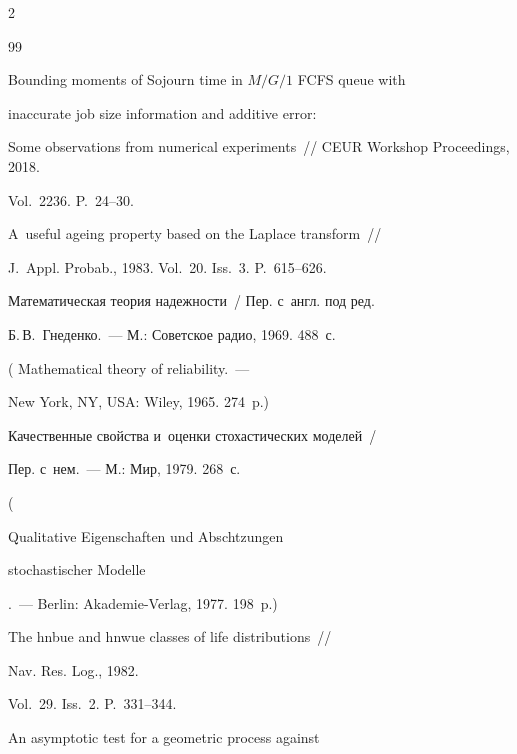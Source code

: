\begin{multicols}{2}
{{\begin{thebibliography}{99}

Bounding moments of Sojourn time in $M/G/1$ FCFS queue with 

inaccurate job size information and additive error: 

Some observations from numerical experiments~// CEUR Workshop Proceedings, 2018. 

Vol.~2236. P.~24--30.







A~useful ageing property based on the Laplace transform~//

J.~Appl. Probab., 1983. Vol.~20. Iss.~3. P.~615--626.










 Математическая теория надежности~/ Пер. с~англ. под ред. 

Б.\,В.~Гнеденко.~--- М.: Советское радио, 1969. 488~с.

(  {Mathematical theory of reliability}.~---

New York, NY, USA: Wiley, 1965. 274~p.)




 Качественные свойства и~оценки стохастических моделей~/

Пер. с~нем.~--- М.: Мир, 1979. 268~с.

(  {Qualitative Eigenschaften und Abschtzungen 

stochastischer Modelle}.~--- Berlin: Akademie-Verlag, 1977. 198~p.)






 The hnbue and hnwue classes of life distributions~// 

Nav. Res. Log., 1982.

Vol.~29. Iss.~2. P.~331--344.




 An asymptotic test for a geometric process against 


\end{thebibliography}}}
\end{multicols}
